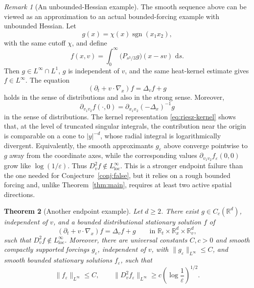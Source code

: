 \documentclass[11pt,reqno]{amsart}
\numberwithin{equation}{section}
\newtheorem{theorem}{Theorem}[section]
\theoremstyle{remark}
\newtheorem{remark}[theorem]{Remark}
\newcommand{\R}{\mathbb{R}}
\newcommand{\dd}{\,\mathrm{d}}
\begin{document}
\begin{remark}[An unbounded-Hessian example]\label{rem:Linfty-unbounded}
The smooth sequence above can be viewed as an approximation to an actual
bounded-forcing example with unbounded Hessian.  Let
\[
   g(x)=\chi(x)\operatorname{sgn}(x_1x_2),
\]
with the same cutoff \(\chi\), and define
\[
   f(x,v)=\int_0^\infty \big(P_{s^3/3}g\big)(x-sv)\,\dd s.
\]
Then \(g\in L^\infty\cap L^1\), \(g\) is independent of \(v\), and the same
heat-kernel estimate gives \(f\in L^\infty\).  The equation
\[
   (\partial_t+v\cdot\nabla_x)f=\Delta_vf+g
\]
holds in the sense of distributions {and also in the strong sense}.  Moreover,
\[
   \partial_{v_1v_2}f(\cdot,0)
   =\partial_{x_1x_2}(-\Delta_x)^{-1}g
\]
in the sense of distributions.  The kernel representation
\eqref{eq:riesz-kernel} shows that, at the level of truncated singular
integrals, the contribution near the origin is comparable on a cone to
\(|y|^{-d}\), whose radial integral is logarithmically divergent.  Equivalently,
the smooth approximants \(g_\varepsilon\) above converge pointwise to \(g\) away
from the coordinate axes, while the corresponding values
\(\partial_{v_1v_2}f_\varepsilon(0,0)\) grow like \(\log(1/\varepsilon)\).
Thus \(D_v^2f\notin L^\infty_{\mathrm{loc}}\).  This is a stronger endpoint
failure than the one needed for Conjecture~\ref{conj:false}, but it relies on a
rough bounded forcing and, unlike Theorem~\ref{thm:main}, requires at least two
active spatial directions.

\end{remark}

\begin{theorem}[Another endpoint example]\label{prop:potential-endpoint}
Let \(d\ge2\).  There exist \(g\in {C_c}(\R^d)\), independent of
\(v\), and a bounded distributional stationary solution \(f\) of
\[
   (\partial_t+v\cdot\nabla_x)f=\Delta_v f+g
   \qquad\text{in }\R_t\times\R_x^d\times\R_v^d,
\]
such that \(D_v^2f\notin L^\infty_{\mathrm{loc}}\).  Moreover, there are {universal constants $C,c>0$ and}
smooth compactly supported forcings \(g_\varepsilon\), independent of \(v\),
with \(\|g_\varepsilon\|_{L^\infty}\le C\), and smooth bounded stationary
solutions \(f_\varepsilon\), such that
\[
   \|f_\varepsilon\|_{L^\infty}\le C,
   \qquad
   \|D_v^2f_\varepsilon\|_{L^\infty}\ge c\left(\log\frac1\varepsilon\right)^{1/2}.
\]
\end{theorem}
\end{document}

